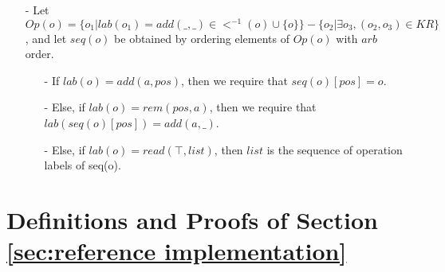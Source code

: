 {\begin{itemize}
    \begin{itemize}
    \setlength{\itemsep}{0.5pt}
    \item[-] Let $O_k = O_k \cup \{ o_1 \}$, where $<^{-1}(o_1) \subseteq O_k$.

    \item[-] Let $O_r$ be the set of $rem$ operations in $<^{-1}(o_1)$. %

    \item[-] Let $Op(o_1) = \{ o_2 \vert lab(o_2)=add(\_,\_) \in <^{-1}(o_1) \cup \{ o_1 \} \} - \{ o_3 \vert \exists o_4, (o_3,o_4) \in KR \}$. Let $seq(o_1)$ be obtained by ordering elements of $Op(o_1)$ with $arb$ order.

    \item[-] If $lab(o_1) = rem(pos,a)$, then we require that $lab(seq(o_1)[pos])=add(a,\_)$, and change $KR$ into $KR \cup \{ (seq(o_1)[pos],o_1) \}$.

    \item[-] Else, if $lab(o_1) = add(a,pos)$, then we require that $seq(o_1)[pos] = o_1$.
    \end{itemize}

    We require that this procedure be terminated with $O_k = O$.

\item[-] {\color {red}Let $Op(o) = \{ o_1 \vert lab(o_1)=add(\_,\_) \in <^{-1}(o) \cup \{ o \} \} - \{ o_2 \vert \exists o_3, (o_2,o_3) \in KR \}$, and let $seq(o)$ be obtained by ordering elements of $Op(o)$ with $arb$ order.}

    \begin{itemize}
    \setlength{\itemsep}{0.5pt}
    \item[-] If $lab(o)=add(a,pos)$, then we require that $seq(o)[pos]=o$.

    \item[-] Else, if $lab(o)=rem(pos,a)$, then we require that $lab(seq(o)[pos]) = add(a,\_)$.

    \item[-] Else, if $lab(o)=read(\top,list)$, then $list$ is the sequence of operation labels of seq(o).
    \end{itemize}
\end{itemize}


\section{Definitions and Proofs of Section \ref{sec:reference implementation}}
\label{sec:appendix definitions and proofs of section reference implementation}



}
